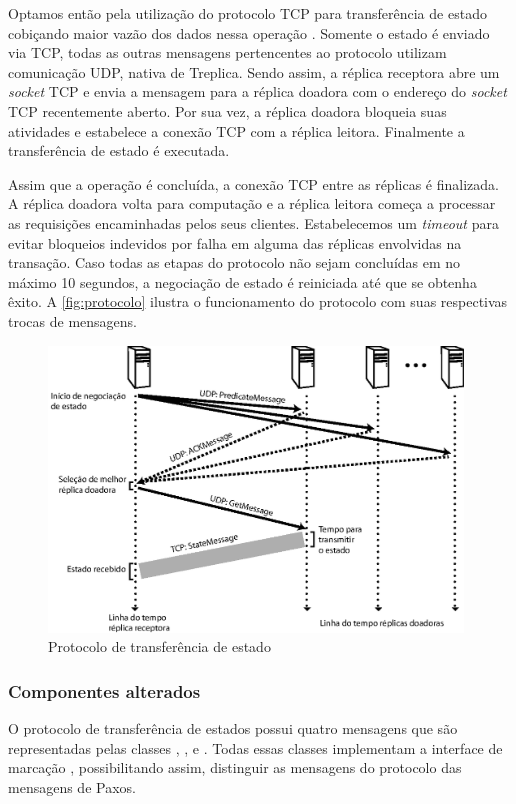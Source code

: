 Optamos então pela utilização do protocolo TCP para transferência de estado cobiçando
maior vazão dos dados nessa operação \cite{abdellatif04}. Somente o estado é enviado via
TCP, todas as outras mensagens pertencentes ao protocolo utilizam comunicação UDP, nativa
de Treplica. Sendo assim, a réplica receptora abre um \emph{socket} TCP e envia a mensagem
 para a réplica doadora com o endereço do \emph{socket} TCP
recentemente aberto. Por sua vez, a réplica doadora bloqueia suas atividades e estabelece
a conexão TCP com a réplica leitora. Finalmente a transferência de estado é executada.

Assim que a operação é concluída, a conexão TCP entre as réplicas é finalizada. A réplica
doadora volta para computação e a réplica leitora começa a processar as requisições
encaminhadas pelos seus clientes. Estabelecemos um \emph{timeout} para evitar bloqueios
indevidos por falha em alguma das réplicas envolvidas na transação. Caso todas as etapas
do protocolo não sejam concluídas em no máximo 10 segundos, a negociação de estado é
reiniciada até que se obtenha êxito. A \autoref{fig:protocolo} ilustra o funcionamento do
protocolo com suas respectivas trocas de mensagens.

\begin{figure}[ht]
  \centering
  \includegraphics[width=11cm]{conteudo/capitulos/figuras/transferencia_estado.eps}
  \caption{Protocolo de transferência de estado}
  \label{fig:protocolo}
\end{figure}

\subsubsection{Componentes alterados}

O protocolo de transferência de estados possui quatro mensagens que são representadas
pelas classes , ,  e
. Todas essas classes implementam a interface de marcação
, possibilitando assim, distinguir as mensagens do
protocolo das mensagens de Paxos.

